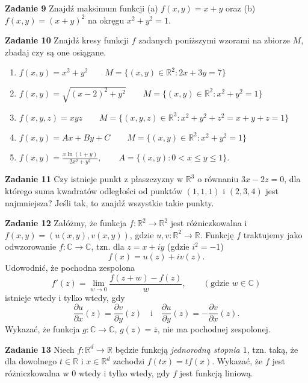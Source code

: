 \documentclass[a4paper,11pt]{article}
\newcommand{\RR}{\mathbb{R}}
\newcommand{\CC}{\mathbb{C}}
\begin{document}
\bigskip

\textbf{Zadanie 9} Znajdź maksimum funkcji (a) $f(x,y) = x+y$ oraz (b)
$f(x,y) =(x+y)^2$ na okręgu $x^2+y^2 = 1$.

\bigskip

\textbf{Zadanie 10} Znajdź kresy funkcji $f$ zadanych poniższymi wzorami
na zbiorze $M$, zbadaj czy są one osiągane.

\begin{enumerate}
  \item $f(x,y) = x^2 + y^2 \qquad M=\{(x,y) \in \mathbb{R}^2 : 2x + 3y = 7\}$ 
  \item $f(x,y) = \sqrt{(x-2)^2 + y^2} \qquad M=\{(x,y) \in \mathbb{R}^2 :
    x^2 + y^2= 1\}$ 
  \item $f(x,y,z) = xyz \qquad M=\{(x,y,z) \in \mathbb{R}^3 : x^2 + y^2 +
      z^2= x+y+z = 1\}$ 
  \item $f(x,y) = Ax + By + C \qquad M=\{(x,y) \in \mathbb{R}^2 : x^2 +
    y^2 = 1\}$ 
  \item 
    $f(x,y)=\displaystyle\frac{x \ln(1+y) }{2x^2+y^2}, \qquad A=
    \{(x,y): 0<x\le y\le 1\}$.
\end{enumerate}

\bigskip

\textbf{Zadanie 11} Czy istnieje punkt z płaszczyzny w $\mathbb{R}^3$ o
równaniu $3x − 2z = 0$, dla którego suma kwadratów odległości od punktów
$(1, 1, 1)$ i $(2, 3, 4)$ jest najmniejsza?  Jeśli tak, to znajdź
wszystkie takie punkty.

\bigskip

\textbf{Zadanie 12} Załóżmy, że funkcja $f: \RR^2 \to \RR^2$ jest
różniczkowalna i $f(x,y) = (u(x,y), v(x,y))$, gdzie
$u,v: \RR^2 \to \RR$. Funkcję $f$ traktujemy jako odwzorowanie $f:
\CC \to \CC$, tzn. dla $z = x + iy$ (gdzie $i^2 = -1$)
$$ f(x) = u(z) + i v(z). $$
Udowodnić, że pochodna zespolona 
$$ f'(z) = \lim_{w \to 0} \frac{f(z+w) - f(z)}{w}, \qquad
(\text{gdzie } w \in \CC) $$
istnieje wtedy i tylko wtedy, gdy
$$ \frac{\partial u}{\partial x}(z) =
\frac{\partial v}{\partial y} (z) \quad \text{i}
\quad
\frac{\partial u}{\partial y}(z) =
-\frac{\partial v}{\partial x} (z).  $$
Wykazać, że funkcja $g: \CC \to
\CC$,  $g(z) = \overline z$, nie ma
pochodnej zespolonej.

\bigskip

\textbf{Zadanie 13} Niech $f:\RR^d \to \RR$ będzie funkcją
\textit{jednorodną stopnia $1$}, tzn. taką, że dla dowolnego $t\in \RR$ i
$x\in \RR^d$ zachodzi $f(t x)=t f(x)$. Wykazać, że $f$ jest
różniczkowalna w $0$ wtedy i tylko wtedy, gdy $f$ jest funkcją liniową. 
\end{document}
